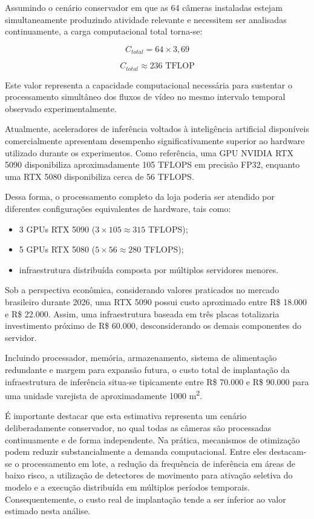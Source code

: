 \documentclass[12pt, %
openright, 
oneside, %
a4paper,    %
brazil]{facom-ufu-abntex2}
\begin{document}
Assumindo o cenário conservador em que as 64 câmeras instaladas estejam simultaneamente produzindo atividade relevante e necessitem ser analisadas continuamente, a carga computacional total torna-se:

\begin{equation}
C_{total}=64 \times 3,69
\end{equation}

\begin{equation}
C_{total}\approx 236 \text{ TFLOP}
\end{equation}

Este valor representa a capacidade computacional necessária para sustentar o processamento simultâneo dos fluxos de vídeo no mesmo intervalo temporal observado experimentalmente.

Atualmente, aceleradores de inferência voltados à inteligência artificial disponíveis comercialmente apresentam desempenho significativamente superior ao hardware utilizado durante os experimentos. Como referência, uma GPU NVIDIA RTX 5090 disponibiliza aproximadamente 105 TFLOPS em precisão FP32, enquanto uma RTX 5080 disponibiliza cerca de 56 TFLOPS.

Dessa forma, o processamento completo da loja poderia ser atendido por diferentes configurações equivalentes de hardware, tais como:

\begin{itemize}
\item 3 GPUs RTX 5090 ($3 \times 105 \approx 315$ TFLOPS);
\item 5 GPUs RTX 5080 ($5 \times 56 \approx 280$ TFLOPS);
\item infraestrutura distribuída composta por múltiplos servidores menores.
\end{itemize}

Sob a perspectiva econômica, considerando valores praticados no mercado brasileiro durante 2026, uma RTX 5090 possui custo aproximado entre R\$ 18.000 e R\$ 22.000. Assim, uma infraestrutura baseada em três placas totalizaria investimento próximo de R\$ 60.000, desconsiderando os demais componentes do servidor.

Incluindo processador, memória, armazenamento, sistema de alimentação redundante e margem para expansão futura, o custo total de implantação da infraestrutura de inferência situa-se tipicamente entre R\$ 70.000 e R\$ 90.000 para uma unidade varejista de aproximadamente 1000 m\textsuperscript{2}.

É importante destacar que esta estimativa representa um cenário deliberadamente conservador, no qual todas as câmeras são processadas continuamente e de forma independente. Na prática, mecanismos de otimização podem reduzir substancialmente a demanda computacional. Entre eles destacam-se o processamento em lote, a redução da frequência de inferência em áreas de baixo risco, a utilização de detectores de movimento para ativação seletiva do modelo e a execução distribuída em múltiplos períodos temporais. Consequentemente, o custo real de implantação tende a ser inferior ao valor estimado nesta análise.
\end{document}
